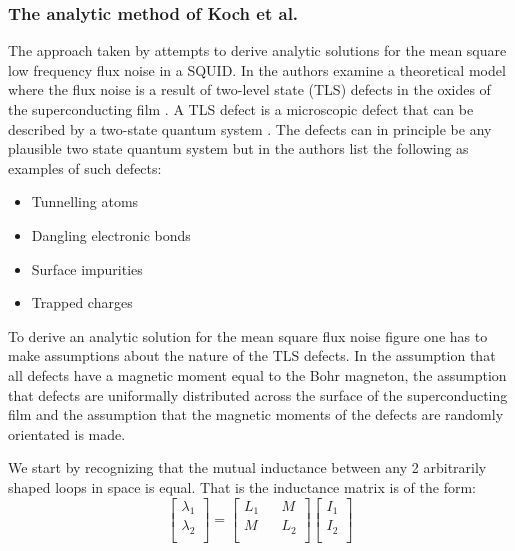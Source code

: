 \subsubsection*{The analytic method of Koch et al.}
The approach taken by \cite{KochModel} attempts to derive analytic solutions for the mean square low frequency flux noise in a SQUID. In \cite{KochModel} the authors examine a theoretical model where the flux noise is a result of two-level state (TLS) defects in the oxides of the superconducting film \cite{KochModel}. A TLS defect is a microscopic defect that can be described by a two-state quantum system \cite{KochModel}. The defects can in principle be any plausible two state quantum system but in \cite{TLSDefectExplanation} the authors list the following as examples of such defects:
\begin{center}
    \begin{itemize}
        \item Tunnelling atoms \\
        \item Dangling electronic bonds \\
        \item Surface impurities \\
        \item Trapped charges \\
    \end{itemize}
\end{center}
To derive an analytic solution for the mean square flux noise figure one has to make assumptions about the nature of the TLS defects. In \cite{KochModel} the assumption that all defects have a magnetic moment equal to the Bohr magneton, the assumption that defects are uniformally distributed across the surface of the superconducting film and the assumption that the magnetic moments of the defects are randomly orientated is made. \par
We start by recognizing that the mutual inductance between any 2 arbitrarily shaped loops in space is equal. That is the inductance matrix is of the form: 
\begin{equation}
    \begin{bmatrix}
        \lambda_1 \\
        \lambda_2 \\
    \end{bmatrix} 
    = 
    \begin{bmatrix}
        L_1 && M \\
        M && L_2 \\
    \end{bmatrix}
    \begin{bmatrix}
       I_1 \\
       I_2 \\
    \end{bmatrix}
    \label{eq:InductanceMatrix}
\end{equation}
